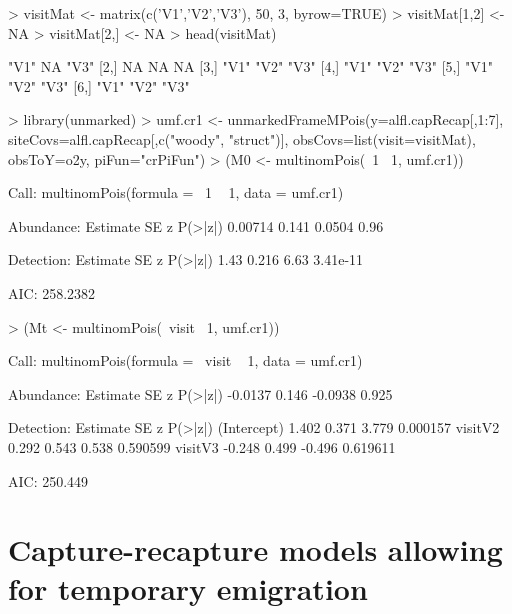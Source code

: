 \documentclass[a4paper]{article}
\renewenvironment{Schunk}{\vspace{\topsep}}{\vspace{\topsep}}
\begin{document}
\begin{Schunk}
\begin{Sinput}
> visitMat <- matrix(c('V1','V2','V3'), 50, 3, byrow=TRUE)
> visitMat[1,2] <- NA
> visitMat[2,] <- NA
> head(visitMat)
\end{Sinput}
\begin{Soutput}
     [,1] [,2] [,3]
[1,] "V1" NA   "V3"
[2,] NA   NA   NA  
[3,] "V1" "V2" "V3"
[4,] "V1" "V2" "V3"
[5,] "V1" "V2" "V3"
[6,] "V1" "V2" "V3"
\end{Soutput}
\begin{Sinput}
> library(unmarked)
> umf.cr1 <- unmarkedFrameMPois(y=alfl.capRecap[,1:7],
                         siteCovs=alfl.capRecap[,c("woody", "struct")],
                         obsCovs=list(visit=visitMat),
                         obsToY=o2y, piFun="crPiFun")
> (M0 <- multinomPois(~1 ~1, umf.cr1))
\end{Sinput}
\begin{Soutput}
Call:
multinomPois(formula = ~1 ~ 1, data = umf.cr1)

Abundance:
 Estimate    SE      z P(>|z|)
  0.00714 0.141 0.0504    0.96

Detection:
 Estimate    SE    z  P(>|z|)
     1.43 0.216 6.63 3.41e-11

AIC: 258.2382 
\end{Soutput}
\end{Schunk}




\begin{Schunk}
\begin{Sinput}
> (Mt <- multinomPois(~visit ~1, umf.cr1))
\end{Sinput}
\begin{Soutput}
Call:
multinomPois(formula = ~visit ~ 1, data = umf.cr1)

Abundance:
 Estimate    SE       z P(>|z|)
  -0.0137 0.146 -0.0938   0.925

Detection:
            Estimate    SE      z  P(>|z|)
(Intercept)    1.402 0.371  3.779 0.000157
visitV2        0.292 0.543  0.538 0.590599
visitV3       -0.248 0.499 -0.496 0.619611

AIC: 250.449 
\end{Soutput}
\end{Schunk}



\section{Capture-recapture models allowing for temporary emigration}




\end{document}
